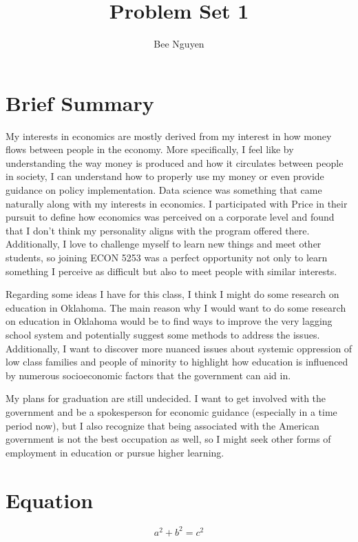 \documentclass{article}
\title{Problem Set 1}
\author{Bee Nguyen}
\begin{document}
\maketitle

\section{Brief Summary}

My interests in economics are mostly derived from my interest in how money flows between people in the economy. More specifically, I feel like by understanding the way money is produced and how it circulates between people in society, I can understand how to properly use my money or even provide guidance on policy implementation. Data science was something that came naturally along with my interests in economics. I participated with Price in their pursuit to define how economics was perceived on a corporate level and found that I don't think my personality aligns with the program offered there. Additionally, I love to challenge myself to learn new things and meet other students, so joining ECON 5253 was a perfect opportunity not only to learn something I perceive as difficult but also to meet people with similar interests. 

Regarding some ideas I have for this class, I think I might do some research on education in Oklahoma. The main reason why I would want to do some research on education in Oklahoma would be to find ways to improve the very lagging school system and potentially suggest some methods to address the issues. Additionally, I want to discover more nuanced issues about systemic oppression of low class families and people of minority to highlight how education is influenced by numerous socioeconomic factors that the government can aid in. 

My plans for graduation are still undecided. I want to get involved with the government and be a spokesperson for economic guidance (especially in a time period now), but I also recognize that being associated with the American government is not the best occupation as well, so I might seek other forms of employment in education or pursue higher learning. 

\section{Equation}
$$a^2+b^2=c^2$$
\end{document}
